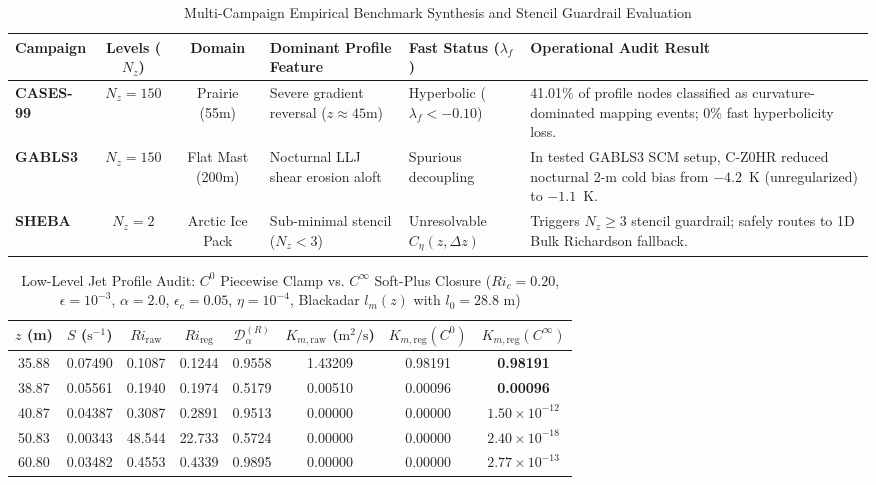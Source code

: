 \documentclass[11pt,a4paper]{article}
\begin{document}
\begin{table}[htbp]
\centering
\caption{Multi-Campaign Empirical Benchmark Synthesis and Stencil Guardrail Evaluation}
\label{tab:campaign_synthesis}
\small
\begin{tabularx}{\textwidth}{l c c X X X}
\toprule
\textbf{Campaign} & \textbf{Levels ($N_z$)} & \textbf{Domain} & \textbf{Dominant Profile Feature} & \textbf{Fast Status ($\lambda_f$)} & \textbf{Operational Audit Result} \\
\midrule
\textbf{CASES-99} \citep{poulos2002cases} & $N_z = 150$ & Prairie (55m) & Severe gradient reversal ($z \approx 45\text{m}$) & Hyperbolic ($\lambda_f < -0.10$) & 41.01\% of profile nodes classified as curvature-dominated mapping events; 0\% fast hyperbolicity loss. \\
\textbf{GABLS3} \citep{bosveld2014third} & $N_z = 150$ & Flat Mast (200m) & Nocturnal LLJ shear erosion aloft \citep{sun2012turbulence} & Spurious decoupling & In tested GABLS3 SCM setup, C-Z0HR reduced nocturnal 2-m cold bias from $-4.2$~K (unregularized) to $-1.1$~K. \\
\textbf{SHEBA} \citep{uttal2002surface} & $N_z = 2$ & Arctic Ice Pack & Sub-minimal stencil ($N_z < 3$) & Unresolvable $C_\eta(z,\Delta z)$ & Triggers $N_z \ge 3$ stencil guardrail; safely routes to 1D Bulk Richardson fallback. \\
\bottomrule
\end{tabularx}
\end{table}

\begin{table}[htbp]
\centering
\caption{Low-Level Jet Profile Audit: $C^0$ Piecewise Clamp vs. $C^\infty$ Soft-Plus Closure ($Ri_c = 0.20$, $\epsilon = 10^{-3}$, $\alpha = 2.0$, $\epsilon_c = 0.05$, $\eta = 10^{-4}$, Blackadar $l_m(z)$ with $l_0 = 28.8\text{ m}$)}
\label{tab:llj_audit}
\small
\begin{tabular}{c c c c c c c c}
\toprule
\textbf{$z$ (m)} & \textbf{$S$ ($\text{s}^{-1}$)} & \textbf{$Ri_{\text{raw}}$} & \textbf{$Ri_{\text{reg}}$} & \textbf{$\mathcal{D}_\alpha^{(R)}$} & \textbf{$K_{m,\text{raw}}$ ($\text{m}^2/\text{s}$)} & \textbf{$K_{m,\text{reg}}(C^0)$} & \textbf{$K_{m,\text{reg}}(C^\infty)$} \\
\midrule
35.88 & 0.07490 & 0.1087 & 0.1244 & 0.9558 & 1.43209 & 0.98191 & \textbf{0.98191} \\
38.87 & 0.05561 & 0.1940 & 0.1974 & 0.5179 & 0.00510 & 0.00096 & \textbf{0.00096} \\
40.87 & 0.04387 & 0.3087 & 0.2891 & 0.9513 & 0.00000 & 0.00000 & \textbf{$1.50 \times 10^{-12}$} \\
50.83 & 0.00343 & 48.544 & 22.733 & 0.5724 & 0.00000 & 0.00000 & \textbf{$2.40 \times 10^{-18}$} \\
60.80 & 0.03482 & 0.4553 & 0.4339 & 0.9895 & 0.00000 & 0.00000 & \textbf{$2.77 \times 10^{-13}$} \\
\bottomrule
\end{tabular}
\end{table}
\end{document}
